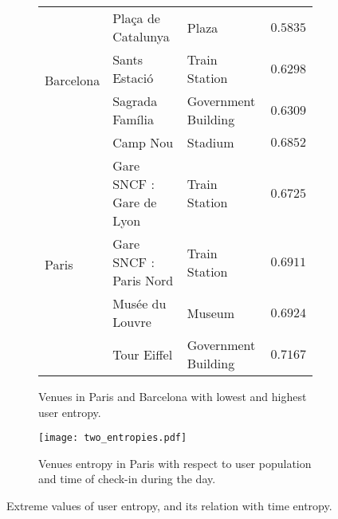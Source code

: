 \begin{figure}[p]
\begin{subfigure}{0.45\textheight}
\begin{tabular}{lllr}
	\multirow{4}{*}{Barcelona} & Plaça de Catalunya              & Plaza                    & $0.5835$ \\
	                           & Sants Estació                   & Train Station            & $0.6298$ \\
	                           & Sagrada Família                 & Government Building      & $0.6309$ \\
	                           & Camp Nou                        & Stadium                  & $0.6852$ \\
	\midrule
	\multirow{4}{*}{Paris}     & Gare SNCF : Gare de Lyon        & Train Station            & $0.6725$ \\
	                           & Gare SNCF : Paris Nord          & Train Station            & $0.6911$ \\
	                           & Musée du Louvre                 & Museum                   & $0.6924$ \\
	                           & Tour Eiffel                     & Government Building      & $0.7167$ \\
	\bottomrule
\end{tabular}
\caption{Venues in Paris and Barcelona with lowest and highest user
entropy.\label{tab:entropy}}
\end{subfigure}

\begin{subfigure}{0.45\textheight} \centering
	\texttt{[image: two\_entropies.pdf]}
	\caption{Venues entropy in Paris with respect to user population and time of check-in
	during the day. \label{fig:two_entropies}}
\end{subfigure}
\caption[Two different measure of entropy]{Extreme values of user entropy, and
its relation with time entropy.\label{fig:entropies}}
\end{figure}

